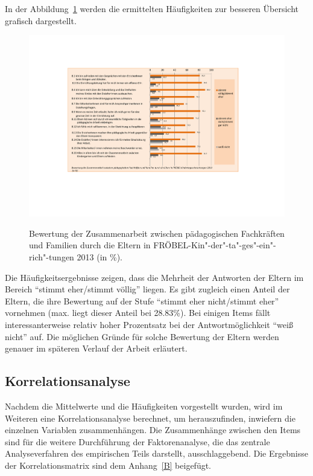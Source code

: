 \documentclass[12pt,a4paper]{article}
\begin{document}
	In der Abbildung~\ref{fig_freq} werden die ermittelten Häufigkeiten zur besseren Übersicht  grafisch dargestellt.

\begin{figure}[h]
\caption{Bewertung der Zusammenarbeit zwischen pädagogischen Fachkräften und Familien durch die Eltern in FRÖBEL-Kin"-der"-ta"-ges"-ein"-rich"-tungen 2013 (in \%).}
\centering
\includegraphics[scale=0.7]{figures/freq_dist3}
\label{fig_freq}
\end{figure}
\FloatBarrier
Die Häufigkeitsergebnisse zeigen, dass die Mehrheit der Antworten der Eltern im Bereich "`stimmt eher/stimmt völlig"' liegen. Es gibt zugleich einen Anteil der Eltern, die ihre Bewertung auf der Stufe "`stimmt eher nicht/stimmt eher"' vornehmen (max. liegt dieser Anteil bei 28.83\%). Bei einigen Items fällt interessanterweise relativ hoher Prozentsatz bei der Antwortmöglichkeit "`weiß nicht"' auf. Die möglichen Gründe für solche Bewertung der Eltern werden genauer im späteren Verlauf der Arbeit erläutert.

\subsection{Korrelationsanalyse}
\label{korr}  
Nachdem die Mittelwerte und die Häufigkeiten vorgestellt wurden, wird im Weiteren eine Korrelationsanalyse berechnet, um herauszufinden, inwiefern die einzelnen Variablen zusammenhängen. Die Zusammenhänge zwischen den Items sind für die weitere Durchführung der Faktorenanalyse, die das zentrale Analyseverfahren des empirischen Teils darstellt, ausschlaggebend. Die Ergebnisse der Korrelationsmatrix sind dem Anhang~\ref{B} beigefügt.
\end{document}
